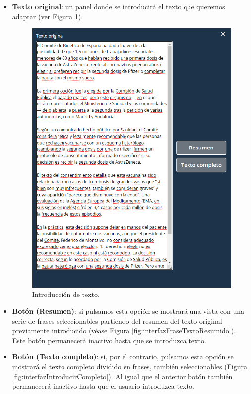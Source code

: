  \begin{itemize}
 	\item \textbf{Texto original}: un  panel donde se introducirá el texto que queremos adaptar (ver Figura \ref{fig:interfazIntroduccionTexto}).
 	\begin{figure}[h!]
 		\centering
 		
 		
 		\includegraphics[scale=0.7]{Imagenes/Figuras/PanelIzquierdo}
 		
 		
 		\caption{Introducción de texto.}
 		\label{fig:interfazIntroduccionTexto}
 	\end{figure}
 	 	\item \textbf{Botón (Resumen)}: si pulsamos esta opción se mostrará una vista con una serie de frases seleccionables partiendo del resumen del texto original previamente introducido (véase Figura \ref{fig:interfazFraseTextoResumido}). Este botón permanecerá inactivo hasta que se introduzca texto. 
 	 	 	\item \textbf{Botón (Texto completo)}: si, por el contrario, pulsamos esta opción se mostrará el texto completo dividido en frases, también seleccionables (Figura \ref{fig:interfazIntroducirCompleto}). Al igual que el anterior botón también permanecerá inactivo hasta que el usuario introduzca texto. 
 	 	 \begin{figure}[h!]
 	 	 	\centering
 	 	 	

\end{figure}
\end{itemize}
